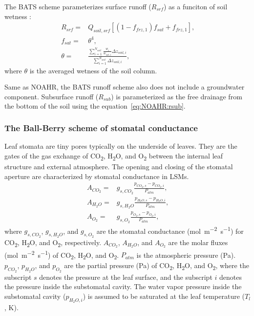 \documentclass[essd]{copernicus}
\begin{document}
The BATS scheme parameterizes surface runoff (\(R_{srf}\)) as a funciton of soil
wetness \citep{yang1996GPC}:
\begin{align}
  R_{srf} = & Q_{soil,srf} \left[ (1 - f_{frz,1}) f_{sat} + f_{frz,1} \right]
  \text{,} \\
  f_{sat} = & \theta^4 \text{,} \\
  \theta =  & \frac{\sum_{i=1}^{N_{soil}}\frac{w_i}{w_{sat,i}}\Delta
  z_{soil,i}}{\sum_{i=1}^{N_{soil}}\Delta z_{soil,i}} \text{,}
\end{align}
where \(\theta\) is the averaged wetness of the soil column.

Same as NOAHR, the BATS runoff scheme also does not include a groundwater
component. Subsurface runoff (\(R_{sub}\)) is parameterized as the free drainage
from the bottom of the soil using the equation~\eqref{eq:NOAHR:rsub}.


\subsubsection{The Ball-Berry scheme of stomatal conductance}

Leaf stomata are tiny pores typically on the underside of leaves. They are the
gates of the gas exchange of CO\textsubscript{2}, H\textsubscript{2}O, and
O\textsubscript{2} between the internal leaf structure and external atmosphere.
The opening and closing of the stomatal aperture are characterized by stomatal
conductance in LSMs.
\begin{align}
  A_{CO_2} = & g_{s,CO_2} \frac{p_{CO_2,s} - p_{CO_2,i}}{P_{atm}} \text{,} \\
  A_{H_2O} = & g_{s,H_2O} \frac{p_{H_2O,s} - p_{H_2O,i}}{P_{atm}} \text{,} \\
  A_{O_2} =  & g_{s,O_2} \frac{p_{O_2,s} - p_{O_2,i}}{P_{atm}} \text{,}
\end{align}
where \(g_{s,CO_2}\), \(g_{s,H_2O}\), and \(g_{s,O_2}\) are the stomatal
conductance (\si{mol~m^{-2}~s^{-1}}) for CO\textsubscript{2},
H\textsubscript{2}O, and O\textsubscript{2}, respectively. \(A_{CO_2}\),
\(A_{H_2O}\), and \(A_{O_2}\) are the molar fluxes (\si{mol~m^{-2}~s^{-1}}) of
CO\textsubscript{2}, H\textsubscript{2}O, and O\textsubscript{2}. \(P_{atm}\) is
the atmospheric pressure (\si{Pa}). \(p_{CO_2}\), \(p_{H_2O}\), and \(p_{O_2}\)
are the partial pressure (\si{Pa}) of CO\textsubscript{2}, H\textsubscript{2}O,
and O\textsubscript{2}, where the subscript \(s\) denotes the pressure at the
leaf surface, and the subscript \(i\) denotes the pressure inside the
substomatal cavity. The water vapor pressure inside the substomatal cavity
(\(p_{H_2O,i}\)) is assumed to be saturated at the leaf temperature (\(T_l\),
\si{K}).
\end{document}
